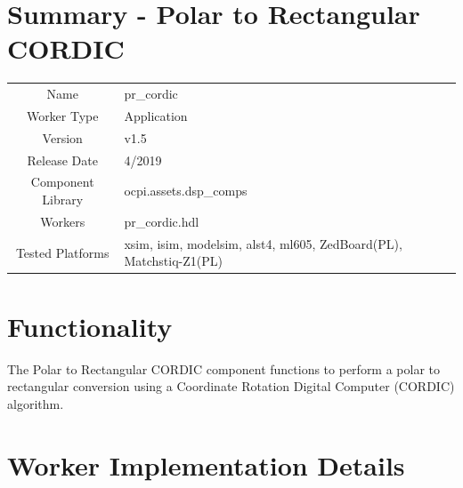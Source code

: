 \documentclass{article}
\author{} %
\date{Version \docVersion} %
\title{\docTitle}
\def\docVersion{1.5}
\def\comp{pr\_cordic}
\def\Comp{Polar to Rectangular CORDIC}
\begin{document}
\section*{Summary - \Comp}
\begin{tabular}{|c|M{13.5cm}|}
	\hline
	                  &                                                              \\
	\hline
	Name              & \comp                                                        \\
	\hline
	Worker Type       & Application                                                  \\
	\hline
	Version           & v\docVersion \\
	\hline
	Release Date      & 4/2019 \\
	\hline
	Component Library & ocpi.assets.dsp\_comps                                        \\
	\hline
	Workers           & \comp.hdl                                                    \\
	\hline
	Tested Platforms  & xsim, isim, modelsim, alst4, ml605, ZedBoard(PL), Matchstiq-Z1(PL) \\
	\hline
\end{tabular}

\section*{Functionality}
\begin{flushleft}
	The {\Comp} component functions to perform a polar to rectangular conversion using a Coordinate Rotation Digital Computer (CORDIC) algorithm.
\end{flushleft}

\section*{Worker Implementation Details}
\end{document}
